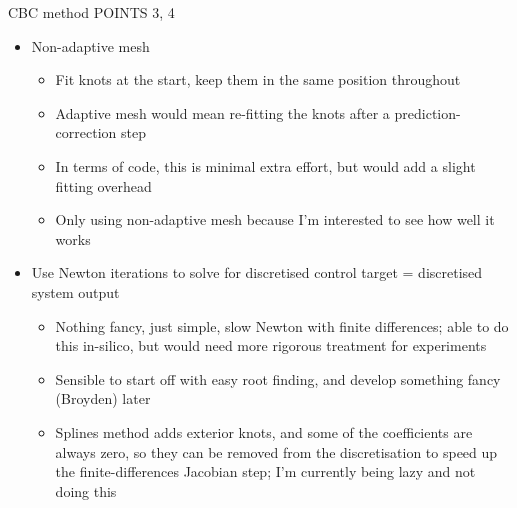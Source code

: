 \documentclass[presentation]{beamer}
\begin{document}
\begin{frame}[plain,label={sec:orgb719042}]{CBC method POINTS 3, 4}
\begin{itemize}
\item Non-adaptive mesh
\begin{itemize}
\item Fit knots at the start, keep them in the same position throughout
\item Adaptive mesh would mean re-fitting the knots after a prediction-correction step
\item In terms of code, this is minimal extra effort, but would add a slight fitting overhead
\item Only using non-adaptive mesh because I'm interested to see how well it works
\end{itemize}

\item Use Newton iterations to solve for discretised control target = discretised system output
\begin{itemize}
\item Nothing fancy, just simple, slow Newton with finite differences; able to do this in-silico, but would need more rigorous treatment for experiments
\item Sensible to start off with easy root finding, and develop something fancy (Broyden) later
\item Splines method adds exterior knots, and some of the coefficients are always zero, so they can be removed from the discretisation to speed up the finite-differences Jacobian step; I'm currently being lazy and not doing this
\end{itemize}
\end{itemize}
\end{frame}
\end{document}
